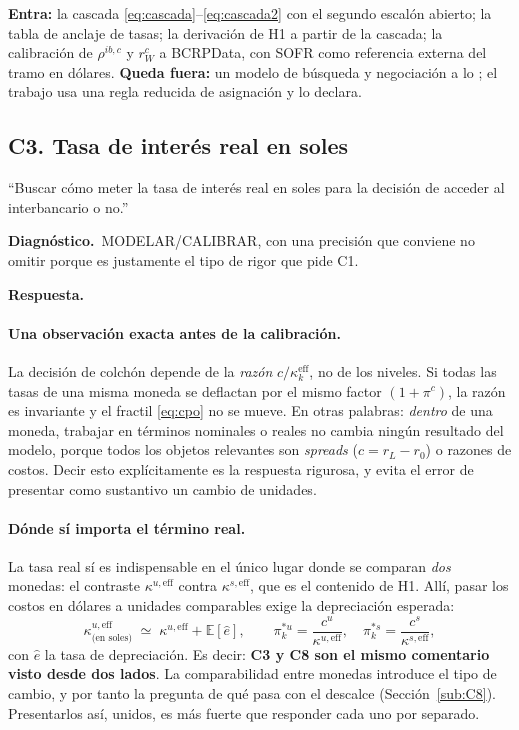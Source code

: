 \documentclass[11pt]{article}
\newcommand{\diag}[1]{\par\noindent\textbf{Diagn\'ostico.}\ #1\par}
\newcommand{\resp}{\par\noindent\textbf{Respuesta.}\par}
\newcommand{\E}{\mathbb{E}}
\newcommand{\keff}{\kappa^{\mathrm{eff}}}
\theoremstyle{definition}
\begin{document}
\begin{ie2}
\textbf{Entra:} la cascada \eqref{eq:cascada}--\eqref{eq:cascada2} con el
segundo escal\'on abierto; la tabla de anclaje de tasas; la derivaci\'on de H1 a
partir de la cascada; la calibraci\'on de $\rho^{ib,c}$ y $r^c_W$ a BCRPData, con
SOFR como referencia externa del tramo en d\'olares.
\textbf{Queda fuera:} un modelo de b\'usqueda y negociaci\'on a lo
\citet{afonso2015}; el trabajo usa una regla reducida de asignaci\'on y lo
declara.
\end{ie2}

\subsection{C3. Tasa de inter\'es real en soles}\label{sub:C3}

\begin{jurado}
``Buscar c\'omo meter la tasa de inter\'es real en soles para la decisi\'on de
acceder al interbancario o no.''
\end{jurado}

\diag{MODELAR/\allowbreak CALIBRAR, con una precisi\'on que conviene no omitir porque es
justamente el tipo de rigor que pide C1.}

\resp

\paragraph{Una observaci\'on exacta antes de la calibraci\'on.} La decisi\'on de
colch\'on depende de la \emph{raz\'on} $c/\keff_k$, no de los niveles. Si todas las
tasas de una misma moneda se deflactan por el mismo factor $(1+\pi^c)$, la
raz\'on es invariante y el fractil \eqref{eq:cpo} no se mueve. En otras palabras:
\emph{dentro} de una moneda, trabajar en t\'erminos nominales o reales no cambia
ning\'un resultado del modelo, porque todos los objetos relevantes son
\emph{spreads} ($c=r_L-r_0$) o razones de costos. Decir esto expl\'icitamente es
la respuesta rigurosa, y evita el error de presentar como sustantivo un cambio
de unidades.

\paragraph{D\'onde s\'i importa el t\'ermino real.} La tasa real s\'i es
indispensable en el \'unico lugar donde se comparan \emph{dos} monedas: el
contraste $\kappa^{u,\mathrm{eff}}$ contra $\kappa^{s,\mathrm{eff}}$, que es el
contenido de H1. All\'i, pasar los costos en d\'olares a unidades comparables
exige la depreciaci\'on esperada:
\begin{equation}
\kappa^{u,\mathrm{eff}}_{\text{(en soles)}}
\;\simeq\; \kappa^{u,\mathrm{eff}}+\E[\hat e],
\qquad
\pi^{*u}_k=\frac{c^u}{\kappa^{u,\mathrm{eff}}},\quad
\pi^{*s}_k=\frac{c^s}{\kappa^{s,\mathrm{eff}}},
\label{eq:real}
\end{equation}
con $\hat e$ la tasa de depreciaci\'on. Es decir: \textbf{C3 y C8 son el mismo
comentario visto desde dos lados}. La comparabilidad entre monedas introduce el
tipo de cambio, y por tanto la pregunta de qu\'e pasa con el descalce
(Secci\'on~\ref{sub:C8}). Presentarlos as\'i, unidos, es m\'as fuerte que responder
cada uno por separado.
\end{document}

